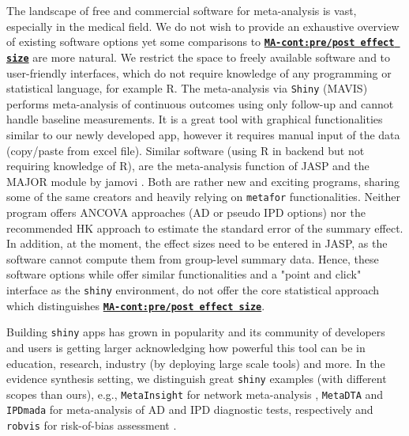 \documentclass[AMA,STIX1COL]{WileyNJD-v2}
\begin{document}
The landscape of free and commercial software for meta-analysis is vast, especially in the medical field. We do not wish to provide an exhaustive overview of existing software options yet some comparisons to \href{https://katerina-pap.shinyapps.io/MA-cont-prepostES/}{\textbf{\texttt{MA-cont:pre/post effect size}}} are more natural. We restrict the space to freely available software and to user-friendly interfaces, which do not require knowledge of any programming or statistical language, for example R. The meta-analysis via \texttt{Shiny} (MAVIS) \citep{hamilton2014meta} performs meta-analysis of continuous outcomes using only follow-up and cannot handle baseline measurements. It is a great tool with graphical functionalities similar to our newly developed app, however it requires manual input of the data (copy/paste from excel file). %
Similar software (using R in backend but not requiring knowledge of R), are the meta-analysis function of JASP \citep{JASP2020} and the MAJOR module by jamovi \citep{jamovi2021}. Both are rather new and exciting programs, sharing some of the same creators and heavily relying on \texttt{metafor} functionalities. Neither program offers ANCOVA approaches (AD or pseudo IPD options) nor the recommended HK approach to estimate the standard error of the summary effect. In addition, at the moment, the effect sizes need to be entered in JASP, as the software cannot compute them from group-level summary data. Hence, these software options while offer similar functionalities and a "point and click" interface as the \texttt{shiny} environment, do not offer the core statistical approach which distinguishes \href{https://katerina-pap.shinyapps.io/MA-cont-prepostES/}{\textbf{\texttt{MA-cont:pre/post effect size}}}.

Building \texttt{shiny} apps has grown in popularity and its community of developers and users is getting larger acknowledging how powerful this tool can be in education, research, industry (by deploying large scale tools) and more. In the evidence synthesis setting, we distinguish great \texttt{shiny} examples (with different scopes than ours), e.g., \texttt{MetaInsight} for network meta-analysis \citep{owen2019metainsight}, \texttt{MetaDTA} \citep{freeman2019development} and \texttt{IPDmada} \citep{wang2021ipdmada} for meta-analysis of AD and IPD diagnostic tests, respectively and \texttt{robvis} for risk-of-bias assessment \citep{mcguinness2021risk}.
\end{document}
